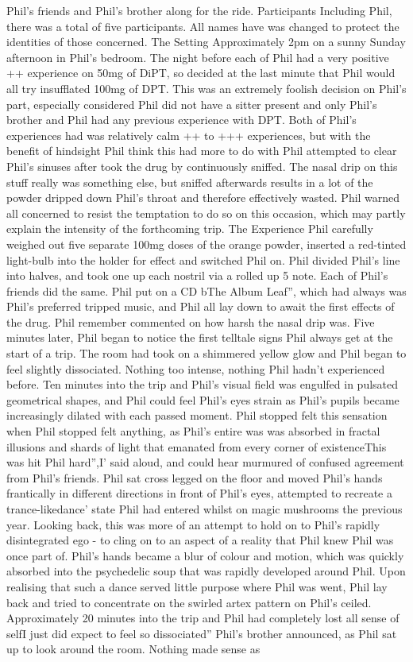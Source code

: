 \documentclass[12pt]{book}
\begin{document}
Phil's friends and Phil's brother along for the ride. Participants Including Phil, there was a total of five participants. All names have was changed to protect the identities of those concerned. The Setting Approximately 2pm on a sunny Sunday afternoon in Phil's bedroom. The night before each of Phil had a very positive ++ experience on 50mg of DiPT, so decided at the last minute that Phil would all try insufflated 100mg of DPT. This was an extremely foolish decision on Phil's part, especially considered Phil did not have a sitter present and only Phil's brother and Phil had any previous experience with DPT. Both of Phil's experiences had was relatively calm ++ to +++ experiences, but with the benefit of hindsight Phil think this had more to do with Phil attempted to clear Phil's sinuses after took the drug by continuously sniffed. The nasal drip on this stuff really was something else, but sniffed afterwards results in a lot of the powder dripped down Phil's throat and therefore effectively wasted. Phil warned all concerned to resist the temptation to do so on this occasion, which may partly explain the intensity of the forthcoming trip. The Experience Phil carefully weighed out five separate 100mg doses of the orange powder, inserted a red-tinted light-bulb into the holder for effect and switched Phil on. Phil divided Phil's line into halves, and took one up each nostril via a rolled up 5 note. Each of Phil's friends did the same. Phil put on a CD bThe Album Leaf'', which had always was Phil's preferred tripped music, and Phil all lay down to await the first effects of the drug. Phil remember commented on how harsh the nasal drip was. Five minutes later, Phil began to notice the first telltale signs Phil always get at the start of a trip. The room had took on a shimmered yellow glow and Phil began to feel slightly dissociated. Nothing too intense, nothing Phil hadn't experienced before. Ten minutes into the trip and Phil's visual field was engulfed in pulsated geometrical shapes, and Phil could feel Phil's eyes strain as Phil's pupils became increasingly dilated with each passed moment. Phil stopped felt this sensation when Phil stopped felt anything, as Phil's entire was was absorbed in fractal illusions and shards of light that emanated from every corner of existenceThis was hit Phil hard'',I' said aloud, and could hear murmured of confused agreement from Phil's friends. Phil sat cross legged on the floor and moved Phil's hands frantically in different directions in front of Phil's eyes, attempted to recreate a trance-likedance' state Phil had entered whilst on magic mushrooms the previous year. Looking back, this was more of an attempt to hold on to Phil's rapidly disintegrated ego - to cling on to an aspect of a reality that Phil knew Phil was once part of. Phil's hands became a blur of colour and motion, which was quickly absorbed into the psychedelic soup that was rapidly developed around Phil. Upon realising that such a dance served little purpose where Phil was went, Phil lay back and tried to concentrate on the swirled artex pattern on Phil's ceiled. Approximately 20 minutes into the trip and Phil had completely lost all sense of selfI just did expect to feel so dissociated'' Phil's brother announced, as Phil sat up to look around the room. Nothing made sense as 
\end{document}
